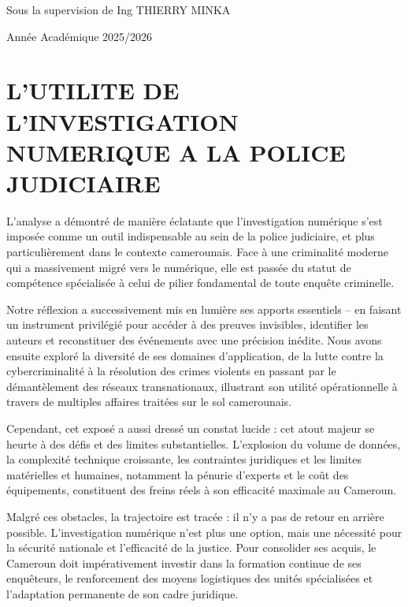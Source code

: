 \documentclass[12pt,a4paper]{article}
\begin{document}
\begin{titlepage}
    \vspace{1cm}
	\begin{Large}
	Sous la supervision de Ing THIERRY MINKA
	\end{Large}
    
    \vspace{1cm}
	\begin{large}
	Année Académique 2025/2026
	\end{large}
\end{titlepage}

\tableofcontents
\newpage

\section{L'UTILITE DE L'INVESTIGATION NUMERIQUE A LA POLICE JUDICIAIRE}

L'analyse a démontré de manière éclatante que l'investigation numérique s'est imposée comme un outil indispensable au sein de la police judiciaire, et plus particulièrement dans le contexte camerounais. Face à une criminalité moderne qui a massivement migré vers le numérique, elle est passée du statut de compétence spécialisée à celui de pilier fondamental de toute enquête criminelle. 

Notre réflexion a successivement mis en lumière ses apports essentiels -- en faisant un instrument privilégié pour accéder à des preuves invisibles, identifier les auteurs et reconstituer des événements avec une précision inédite. Nous avons ensuite exploré la diversité de ses domaines d'application, de la lutte contre la cybercriminalité à la résolution des crimes violents en passant par le démantèlement des réseaux transnationaux, illustrant son utilité opérationnelle à travers de multiples affaires traitées sur le sol camerounais. 

Cependant, cet exposé a aussi dressé un constat lucide : cet atout majeur se heurte à des défis et des limites substantielles. L'explosion du volume de données, la complexité technique croissante, les contraintes juridiques et les limites matérielles et humaines, notamment la pénurie d'experts et le coût des équipements, constituent des freins réels à son efficacité maximale au Cameroun. 

Malgré ces obstacles, la trajectoire est tracée : il n'y a pas de retour en arrière possible. L'investigation numérique n'est plus une option, mais une nécessité pour la sécurité nationale et l'efficacité de la justice. Pour consolider ses acquis, le Cameroun doit impérativement investir dans la formation continue de ses enquêteurs, le renforcement des moyens logistiques des unités spécialisées et l'adaptation permanente de son cadre juridique. 
\end{document}
